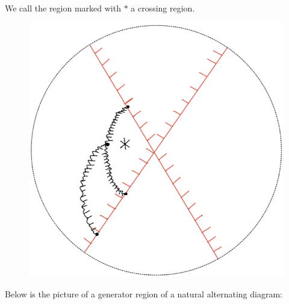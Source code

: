 \begin{definition}
\begin{enumerate}[label = (\roman*)]
\begin{figure}[H]
    \caption{}
    \label{fig:your-label}
\end{figure}
We call the region marked with $*$ a crossing region.
\begin{figure}[H] 
    \centering
    \includegraphics[scale = 0.55]{diagrams/local_systems_on_as_diagrams/11.png} 
    \caption{}
    \label{fig:your-label}
\end{figure}
\end{enumerate}

Below is the picture of a generator region of a natural alternating diagram:


\end{definition}
